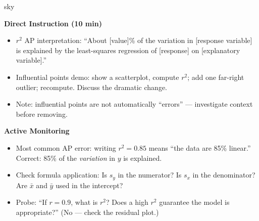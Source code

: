 \documentclass[10pt]{article}
\begin{document}
\begin{skillbox}{sky}
\begin{minipage}[t]{0.48\linewidth}
    \textbf{Direct Instruction (10 min)}
    \begin{itemize}
        \item $r^2$ AP interpretation: ``About [value]\% of the variation in [response variable] is explained by the least-squares regression of [response] on [explanatory variable].''
        \item Influential points demo: show a scatterplot, compute $r^2$; add one far-right outlier; recompute. Discuss the dramatic change.
        \item Note: influential points are not automatically ``errors'' --- investigate context before removing.
    \end{itemize}
\end{minipage}
\hfill
\begin{minipage}[t]{0.48\linewidth}
    \textbf{Active Monitoring}
    \begin{itemize}
        \item Most common AP error: writing $r^2 = 0.85$ means ``the data are 85\% linear.'' Correct: 85\% of the \textit{variation} in $y$ is explained.
        \item Check formula application: Is $s_y$ in the numerator? Is $s_x$ in the denominator? Are $\bar{x}$ and $\bar{y}$ used in the intercept?
        \item Probe: ``If $r = 0.9$, what is $r^2$? Does a high $r^2$ guarantee the model is appropriate?'' (No --- check the residual plot.)
    \end{itemize}
\end{minipage}
\end{skillbox}
\end{document}
